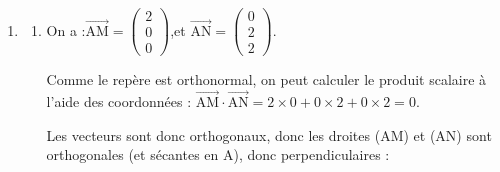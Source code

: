 \documentclass[10pt]{article}
\providecommand{\vectt}[1]{\overrightarrow{\mathrm{#1}}}
\begin{document}
\begin{enumerate}
\begin{enumerate}
			\item Cherchons s'il est possible qu'un point de paramètre $t$ sur (GM) ait les mêmes coordonnées qu'un point de paramètre $k$ sur (AH). Pour cela, résolvons le système :

			$S : \left\{\begin{array}{l}1 + t = 0\\1 - t = k\\1 - t = k\end{array}\right.$
			\qquad on a :\quad
			$S \iff \left\{\begin{array}{l}t = -1 \\k = 1 - (-1)\\k = 1 - (-1)\end{array}\right.$
			\qquad
			Soit \quad$S \iff \left\{\begin{array}{l}t = -1 \\k = 2\\k = 2\end{array}\right.$

			On en déduit que seul un point est commun aux deux droites, c'est le point de paramètre $t = -1$ sur (GM), qui est aussi le point de paramètre $k = 2$ sur (AH).

			Qu'on utilise une représentation paramétrique ou l'autre pour trouver les coordonnées de N, on a bien :\quad N$\big(1 + (- 1) ~;~ 1 -(- 1) ~;~ 1 -(- 1)\big)$ \quad c'est-à-dire \quad N$(0 ~;~ 2 ~;~ 2)$.
		\end{enumerate}

		\item
		\begin{enumerate}
			\item On a :\quad $\vectt{AM} = \begin{pmatrix}2\\0\\0\end{pmatrix}$,\quad et \quad $\vectt{AN} = \begin{pmatrix}0\\2\\2\end{pmatrix}$.

			Comme le repère est orthonormal, on peut calculer le produit scalaire à l'aide des coordonnées :
			\quad $\vectt{AM} \cdot \vectt{AN} = 2 \times 0 + 0 \times 2 + 0 \times 2 = 0$.

			Les vecteurs sont donc orthogonaux, donc les droites (AM) et (AN) sont orthogonales (et sécantes en A), donc perpendiculaires :


\end{enumerate}
\end{enumerate}
\end{document}
